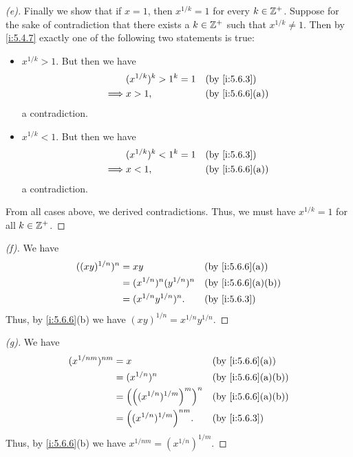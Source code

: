 \begin{proof}[(e)]
  Finally we show that if \(x = 1\), then \(x^{1 / k} = 1\) for every \(k \in \mathbb{Z}^+\).
  Suppose for the sake of contradiction that there exists a \(k \in \mathbb{Z}^+\) such that \(x^{1 / k} \neq 1\).
  Then by \cref{i:5.4.7} exactly one of the following two statements is true:
  \begin{itemize}
    \item \(x^{1 / k} > 1\).
          But then we have
          \begin{align*}
                     & (x^{1 / k})^k > 1^k = 1 &  & \by{i:5.6.3}    \\
            \implies & x > 1,                  &  & \by{i:5.6.6}[a]
          \end{align*}
          a contradiction.
    \item \(x^{1 / k} < 1\).
          But then we have
          \begin{align*}
                     & (x^{1 / k})^k < 1^k = 1 &  & \by{i:5.6.3}    \\
            \implies & x < 1,                  &  & \by{i:5.6.6}[a]
          \end{align*}
          a contradiction.
  \end{itemize}
  From all cases above, we derived contradictions.
  Thus, we must have \(x^{1 / k} = 1\) for all \(k \in \mathbb{Z}^+\).
\end{proof}

\begin{proof}[(f)]
  We have
  \begin{align*}
    ((xy)^{1 / n})^n & = xy                          &  & \by{i:5.6.6}[a]   \\
                     & = (x^{1 / n})^n (y^{1 / n})^n &  & \by{i:5.6.6}[a,b] \\
                     & = (x^{1 / n} y^{1 / n})^n.    &  & \by{i:5.6.3}
  \end{align*}
  Thus, by \cref{i:5.6.6}(b) we have \((xy)^{1 / n} = x^{1 / n} y^{1 / n}\).
\end{proof}

\begin{proof}[(g)]
  We have
  \begin{align*}
    (x^{1 / nm})^{nm} & = x                                 &  & \by{i:5.6.6}[a]   \\
                      & = (x^{1 / n})^n                     &  & \by{i:5.6.6}[a,b] \\
                      & = \pa{\pa{(x^{1 / n})^{1 / m}}^m}^n &  & \by{i:5.6.6}[a,b] \\
                      & = \pa{(x^{1 / n})^{1 / m}}^{nm}.    &  & \by{i:5.6.3}
  \end{align*}
  Thus, by \cref{i:5.6.6}(b) we have \(x^{1 / nm} = (x^{1 / n})^{1 / m}\).
\end{proof}

